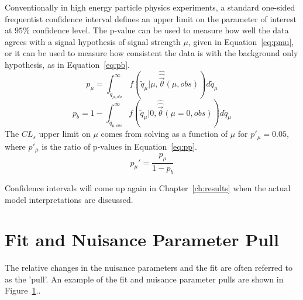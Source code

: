 Conventionally in high energy particle physics experiments, a standard one-sided frequentist confidence interval defines an upper limit on the parameter of interest at $95\%$ confidence level.  The p-value can be used to measure how well the data agrees with a signal hypothesis of signal strength $\mu$, given in Equation~\ref{eq:pmu}, or it can be used to measure how consistent the data is with the background only hypothesis, as in Equation~\ref{eq:pb}.
\begin{equation}
p_\mu=\int_{\tilde{q}_{\mu,obs}}^\infty f(\tilde{q}_\mu|\mu,\hat{\hat{\vec{\theta}}}(\mu,obs)) d\tilde{q}_\mu
\label{eq:pmu}
\end{equation}
\begin{equation}
p_b=1-\int_{\tilde{q}_{\mu,obs}}^\infty f(\tilde{q}_\mu|0,\hat{\hat{\vec{\theta}}}(\mu=0,obs)) d\tilde{q}_\mu
\label{eq:pb}
\end{equation}
The $CL_s$ upper limit on $\mu$ comes from solving as a function of $\mu$ for $p'_\mu=0.05$, where $p'_\mu$ is the ratio of p-values in Equation~\ref{eq:pp}.
\begin{equation}
p_\mu ' = \frac{p_\mu}{1-p_b}
\end{equation}

Confidence intervals will come up again in Chapter~\ref{ch:results} when the actual model interpretations are discussed.


\section{Fit and Nuisance Parameter Pull}

The relative changes in the nuisance parameters and the fit are often referred to as the 'pull'.  An example of the fit and nuisance parameter pulls are shown in Figure~\ref{}..


